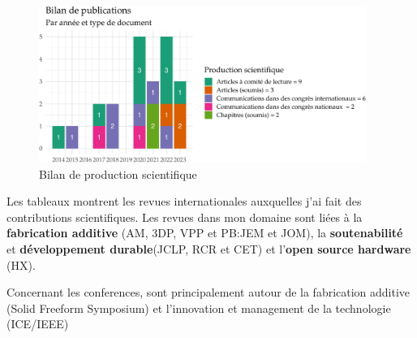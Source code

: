 \documentclass[
  11pt,
]{article}
\begin{document}
\begin{figure}[H]

{\centering \includegraphics[width=0.95\textwidth,height=\textheight]{Figures/fig-bilan-1.pdf}

}

\caption{\label{fig-bilan}Bilan de production scientifique}

\end{figure}

Les tableaux montrent les revues internationales auxquelles j'ai fait
des contributions scientifiques. Les revues dans mon domaine sont liées
à la \textbf{fabrication additive} (AM, 3DP, VPP et PB:JEM et JOM), la
\textbf{soutenabilité} et \textbf{développement durable}(JCLP, RCR et
CET) et l'\textbf{open source hardware} (HX).

Concernant les conferences, sont principalement autour de la fabrication
additive (Solid Freeform Symposium) et l'innovation et management de la
technologie (ICE/IEEE)
\end{document}
